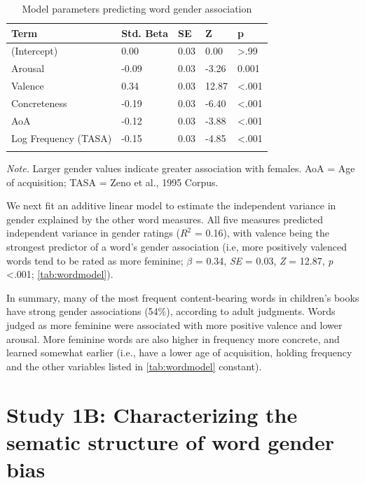 \documentclass[english,,man,floatsintext]{apa6}
\begin{document}
\begin{table}[tbp]
\begin{center}
\begin{threeparttable}
\caption{\label{tab:wordmodel}Model parameters predicting word gender association}
\begin{tabular}{lllll}
\toprule
Term & Std. Beta & SE & Z & p\\
\midrule
(Intercept) & 0.00 & 0.03 & 0.00 & >.99\\
Arousal & -0.09 & 0.03 & -3.26 & 0.001\\
Valence & 0.34 & 0.03 & 12.87 & <.001\\
Concreteness & -0.19 & 0.03 & -6.40 & <.001\\
AoA & -0.12 & 0.03 & -3.88 & <.001\\
Log Frequency (TASA) & -0.15 & 0.03 & -4.85 & <.001\\
\bottomrule
\addlinespace
\end{tabular}
\begin{tablenotes}[para]
\normalsize{\textit{Note.} Larger gender values indicate greater association with females. AoA = Age of acquisition;  TASA = Zeno et al., 1995 Corpus.}
\end{tablenotes}
\end{threeparttable}
\end{center}
\end{table}

We next fit an additive linear model to estimate the independent variance in gender explained by the other word measures. All five measures predicted independent variance in gender ratings (\(R^2\) = 0.16), with valence being the strongest predictor of a word's gender association (i.e, more positively valenced words tend to be rated as more feminine; \(\beta\) = 0.34, \emph{SE} = 0.03, \emph{Z} = 12.87, \emph{p} \textless.001; \autoref{tab:wordmodel}).

In summary, many of the most frequent content-bearing words in children's books have strong gender associations (54\%), according to adult judgments. Words judged as more feminine were associated with more positive valence and lower arousal. More feminine words are also higher in frequency more concrete, and learned somewhat earlier (i.e., have a lower age of acquisition, holding frequency and the other variables listed in \autoref{tab:wordmodel} constant).

\hypertarget{study-1b-characterizing-the-sematic-structure-of-word-gender-bias}{%
\section{Study 1B: Characterizing the sematic structure of word gender bias}\label{study-1b-characterizing-the-sematic-structure-of-word-gender-bias}}
\end{document}
